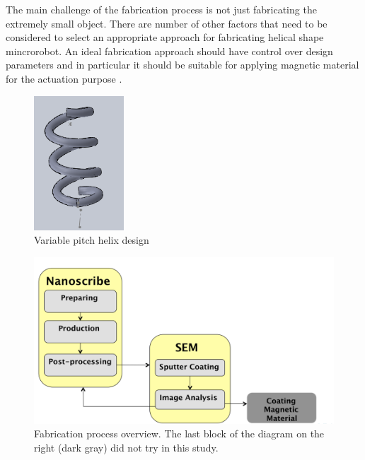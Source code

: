 \documentclass[12pt,a4paper,titlepage]{report}
\begin{document}
The main challenge of the fabrication process is not just fabricating the extremely small object. 
There are number of other factors that need to be considered to select an appropriate approach for 
fabricating helical shape mincrorobot. An ideal fabrication approach should have control over design 
parameters and in particular it should be suitable for applying magnetic material
 for the actuation purpose \citep{peyer2013bio}.


\begin{figure}
  \begin{center}
    \includegraphics[width=0.3\textwidth]{Design7}
  \caption[Variable pitch helix design]{Variable pitch helix design}
  \label{Variable pitch helix design}
\end{center}
\end{figure}




\begin{figure}
  \centering
    \includegraphics[width=1.0\textwidth]{Fabrication_diag}
  \caption[Fabrication process overview]{Fabrication process overview. The last block 
of the diagram on the right (dark gray)  did not try in this study. }
  \label{Fabrication_diag}
\end{figure}
\end{document}
